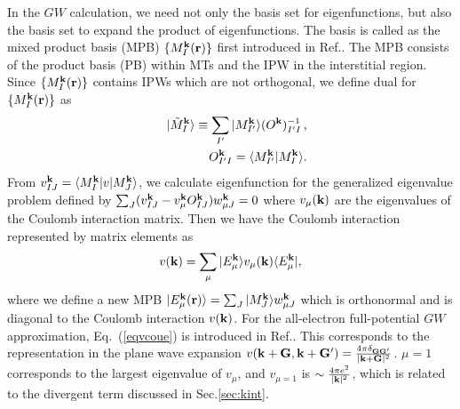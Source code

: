 \documentclass[twocolumn,showpacs,preprintnumbers,amsmath,amssymb,floatfix]{revtex4-1}
\newcommand{\bfk}{{\bf k}}
\newcommand{\bfG}{{\bf G}}
\newcommand{\req}[1]{\mbox{Eq.~\!(\ref{#1})}}
\begin{document}
In the $GW$ calculation, we need not only the basis set for
eigenfunctions, but also the basis set to expand the product of eigenfunctions.
The basis is called as the mixed product basis (MPB) $\{M^{\bf k}_I({\bf r}) \}$
first introduced in Ref.\cite{kotani_all-electron_2002}.
The MPB 
consists of the product basis (PB) within MTs \cite{aryasetiawan_product-basis_1994}
and the IPW in the interstitial region.
Since $\{M^{\bf k}_I({\bf r}) \}$ contains IPWs which are not orthogonal,
we define dual for $\{M^{\bf k}_I({\bf r}) \}$ as
\begin{eqnarray}
&& |\tilde{M}^{\bf k}_{I} \rangle \equiv \sum_{I'}
   |M^{\bf k}_{I'} \rangle (O^{\bf k})^{-1}_{I'I} \, , \\
&& O^{\bf k}_{I'I} = \langle M^{\bf k}_{I'} |  M^{\bf k}_I \rangle.
\end{eqnarray}
From $v_{IJ}^\bfk= \langle M^{\bf k}_{I} |v|  M^{\bf k}_J \rangle$,  
we calculate eigenfunction for the generalized eigenvalue problem defined by
$\sum_J (v_{IJ}^\bfk - v^\bfk_\mu O^{\bfk}_{IJ} ) w_{\mu J}^\bfk = 0$ where
$v_\mu(\bfk)$ are the eigenvalues of the Coulomb interaction matrix.
Then we have the Coulomb interaction represented by matrix elements as 
\begin{eqnarray}
v(\bfk)=\sum_{\mu} | E^{\bfk}_\mu \rangle {v_\mu(\bfk)} 
\langle E^{\bfk}_\mu |,
\label{eqvcoue}
\end{eqnarray}
where we define a new MPB 
$|E^{\bf k}_\mu({\bf r})\rangle=\sum_J |M^\bfk_J\rangle w^\bfk_{\mu J}$ 
which is orthonormal and is diagonal to the Coulomb interaction $v(\bfk)$. 
For the all-electron full-potential $GW$ approximation,
\req{eqvcoue} is introduced in Ref..
This corresponds to the representation in the plane wave expansion 
$v(\bfk+\bfG,\bfk+\bfG')=\frac{4 \pi \delta_{\bfG \bfG'}}{|\bfk+\bfG|^2}$.
$\mu=1$ corresponds to the largest eigenvalue of $v_{\mu}$, and 
$v_{\mu=1}$ is $\sim \frac{4 \pi e^2}{|\bfk|^2}$, which is related to 
the divergent term discussed in Sec.\ref{sec:kint}.
\end{document}
